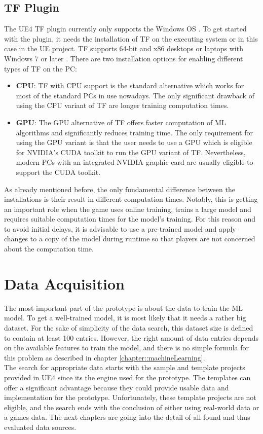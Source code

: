 \documentclass[MGS,Master,english]{twbook}%
\begin{document}
\subsection{\acl{TF} Plugin}
The UE4 \ac{TF} plugin currently only supports the Windows OS \cite{ue4::tensorFlowPlugin}. To get started with the plugin, it needs the installation of \ac{TF} on the executing system or in this case in the UE project. \ac{TF} supports 64-bit and x86 desktops or laptops with Windows 7 or later \cite{api::tensorFlow}. There are two installation options for enabling different types of \ac{TF} on the PC:
\begin{itemize}
	\item \textbf{\ac{CPU}}: \ac{TF} with CPU support is the standard alternative which works for most of the standard PCs in use nowadays. The only significant drawback of using the CPU variant of \ac{TF} are longer training computation times.
	\item \textbf{\ac{GPU}}: The GPU alternative of \ac{TF} offers faster computation of ML algorithms and significantly reduces training time. The only requirement for using the GPU variant is that the user needs to use a GPU which is eligible for NVIDIA's CUDA toolkit \cite{nvidia::cudaToolkit} to run the GPU variant of \ac{TF}. Nevertheless, modern PCs with an integrated NVIDIA graphic card are usually eligible to support the CUDA toolkit. 
\end{itemize}
As already mentioned before, the only fundamental difference between the installations is their result in different computation times. Notably, this is getting an important role when the game uses online training, trains a large model and requires suitable computation times for the model's training. For this reason and to avoid initial delays, it is advisable to use a pre-trained model and apply changes to a copy of the model during runtime so that players are not concerned about the computation time.

\section{Data Acquisition}
The most important part of the prototype is about the data to train the ML model. To get a well-trained model, it is most likely that it needs a rather big dataset. For the sake of simplicity of the data search, this dataset size is defined to contain at least 100 entries. However, the right amount of data entries depends on the available features to train the model, and there is no simple formula for this problem as described in chapter \ref{chapter::machineLearning}. \\
The search for appropriate data starts with the sample and template projects provided in UE4 since its the engine used for the prototype. The templates can offer a significant advantage because they could provide usable data and implementation for the prototype. Unfortunately, these template projects are not eligible, and the search ends with the conclusion of either using real-world data or a games data. The next chapters are going into the detail of all found and thus evaluated data sources.
\end{document}
